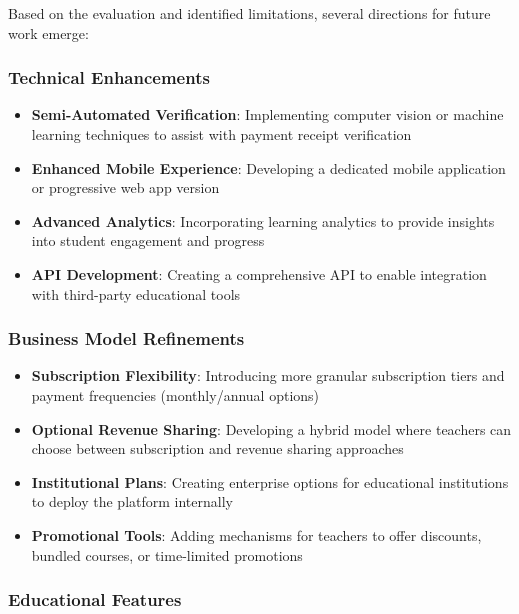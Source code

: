 Based on the evaluation and identified limitations, several directions for future work emerge:

\subsubsection{Technical Enhancements}

\begin{itemize}
    \item \textbf{Semi-Automated Verification}: Implementing computer vision or machine learning techniques to assist with payment receipt verification
    
    \item \textbf{Enhanced Mobile Experience}: Developing a dedicated mobile application or progressive web app version
    
    \item \textbf{Advanced Analytics}: Incorporating learning analytics to provide insights into student engagement and progress
    
    \item \textbf{API Development}: Creating a comprehensive API to enable integration with third-party educational tools
\end{itemize}

\subsubsection{Business Model Refinements}

\begin{itemize}
    \item \textbf{Subscription Flexibility}: Introducing more granular subscription tiers and payment frequencies (monthly/annual options)
    
    \item \textbf{Optional Revenue Sharing}: Developing a hybrid model where teachers can choose between subscription and revenue sharing approaches
    
    \item \textbf{Institutional Plans}: Creating enterprise options for educational institutions to deploy the platform internally
    
    \item \textbf{Promotional Tools}: Adding mechanisms for teachers to offer discounts, bundled courses, or time-limited promotions
\end{itemize}

\subsubsection{Educational Features}

